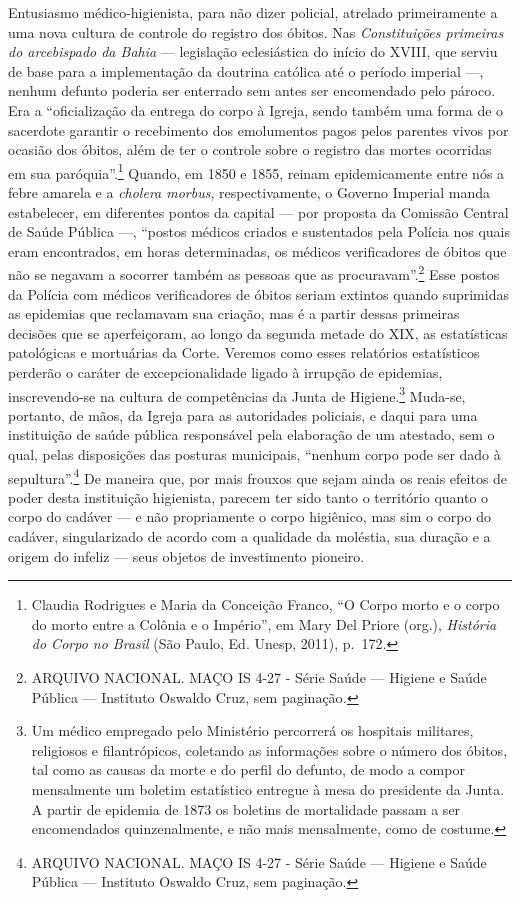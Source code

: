 Entusiasmo médico-higienista, para não dizer policial, atrelado
primeiramente a uma nova cultura de controle do registro dos óbitos. Nas
\textit{Constituições primeiras do arcebispado da Bahia} --- legislação
eclesiástica do início do XVIII, que serviu de base para a implementação
da doutrina católica até o período imperial ---, nenhum defunto poderia
ser enterrado sem antes ser encomendado pelo pároco. Era a
``oficialização da entrega do corpo à Igreja, sendo também uma forma de
o sacerdote garantir o recebimento dos emolumentos pagos pelos parentes
vivos por ocasião dos óbitos, além de ter o controle sobre o registro
das mortes ocorridas em sua paróquia''.\footnote{Claudia Rodrigues e
  Maria da Conceição Franco, ``O Corpo morto e o corpo do morto entre a
  Colônia e o Império'', em Mary Del Priore (org.), \textit{História do
  Corpo no Brasil} (São Paulo, Ed. Unesp, 2011), p.~172.} Quando, em
1850 e 1855, reinam epidemicamente entre nós a febre amarela e a
\textit{cholera morbus}, respectivamente, o Governo Imperial manda
estabelecer, em diferentes pontos da capital --- por proposta da Comissão
Central de Saúde Pública ---, ``postos médicos criados e sustentados pela
Polícia nos quais eram encontrados, em horas determinadas, os médicos
verificadores de óbitos que não se negavam a socorrer também as pessoas
que as procuravam''.\footnote{ARQUIVO NACIONAL. MAÇO IS 4-27 - Série
  Saúde --- Higiene e Saúde Pública --- Instituto Oswaldo Cruz, sem
  paginação\textit{.}} Esse postos da Polícia com médicos verificadores de
óbitos seriam extintos quando suprimidas as epidemias que reclamavam sua
criação, mas é a partir dessas primeiras decisões que se aperfeiçoram,
ao longo da segunda metade do XIX, as estatísticas patológicas e
mortuárias da Corte. Veremos como esses relatórios estatísticos perderão
o caráter de excepcionalidade ligado à irrupção de epidemias,
inscrevendo-se na cultura de competências da Junta de Higiene.\footnote{Um
  médico empregado pelo Ministério percorrerá os hospitais militares,
  religiosos e filantrópicos, coletando as informações sobre o número
  dos óbitos, tal como as causas da morte e do perfil do defunto, de
  modo a compor mensalmente um boletim estatístico entregue à mesa do
  presidente da Junta. A partir de epidemia de 1873 os boletins de
  mortalidade passam a ser encomendados quinzenalmente, e não mais
  mensalmente, como de costume.} Muda-se, portanto, de mãos, da Igreja
para as autoridades policiais, e daqui para uma instituição de saúde
pública responsável pela elaboração de um atestado, sem o qual, pelas
disposições das posturas municipais, ``nenhum corpo pode ser dado à
sepultura''.\footnote{ARQUIVO NACIONAL. MAÇO IS 4-27 - Série Saúde ---
  Higiene e Saúde Pública --- Instituto Oswaldo Cruz, sem paginação.} De
maneira que, por mais frouxos que sejam ainda os reais efeitos de poder
desta instituição higienista, parecem ter sido tanto o território quanto
o corpo do cadáver --- e não propriamente o corpo higiênico, mas sim o
corpo do cadáver, singularizado de acordo com a qualidade da moléstia,
sua duração e a origem do infeliz --- seus objetos de investimento
pioneiro.

